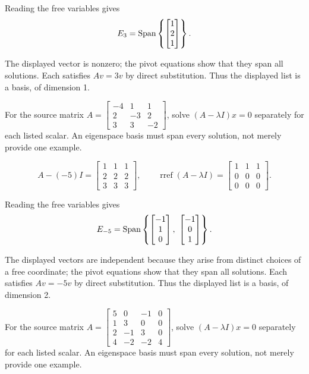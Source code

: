 Reading the free variables gives
\[ E_{3}=\operatorname{Span}\left\{\begin{bmatrix}1\\2\\1\end{bmatrix}\right\}.\]

The displayed vector is nonzero; the pivot equations show that they span all solutions. Each satisfies $Av=3v$ by direct substitution. Thus the displayed list is a basis, of dimension 1.

For the source matrix $A=\begin{bmatrix}-4 & 1 & 1\\2 & -3 & 2\\3 & 3 & -2\end{bmatrix}$, solve $(A-\lambda I)x=0$ separately for each listed scalar. An eigenspace basis must span every solution, not merely provide one example.

\[ A-(-5)I=\begin{bmatrix}1 & 1 & 1\\2 & 2 & 2\\3 & 3 & 3\end{bmatrix},\qquad\operatorname{rref}(A-\lambda I)=\begin{bmatrix}1 & 1 & 1\\0 & 0 & 0\\0 & 0 & 0\end{bmatrix}.\]

Reading the free variables gives
\[ E_{-5}=\Span\left\{\begin{bmatrix}-1\\1\\0\end{bmatrix},\ \begin{bmatrix}-1\\0\\1\end{bmatrix}\right\}.\]

The displayed vectors are independent because they arise from distinct choices of a free coordinate; the pivot equations show that they span all solutions. Each satisfies $Av=-5v$ by direct substitution. Thus the displayed list is a basis, of dimension 2.

For the source matrix $A=\begin{bmatrix}5 & 0 & -1 & 0\\1 & 3 & 0 & 0\\2 & -1 & 3 & 0\\4 & -2 & -2 & 4\end{bmatrix}$, solve $(A-\lambda I)x=0$ separately for each listed scalar. An eigenspace basis must span every solution, not merely provide one example.

